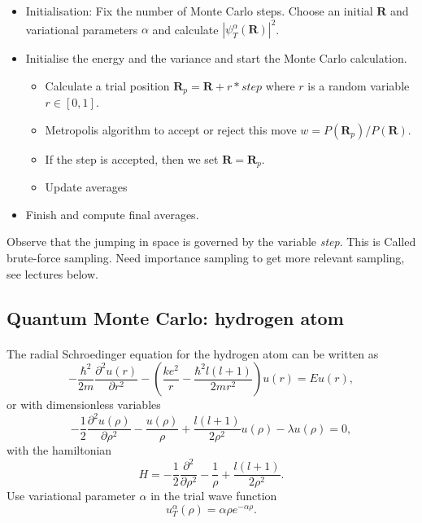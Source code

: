 \documentclass[%
twoside,                 %
final,                   %
10pt]{article}
\begin{document}
\begin{itemize}
   \item Initialisation: Fix the number of Monte Carlo steps. Choose an initial $\bm{R}$ and variational parameters $\alpha$ and calculate $\left|\psi_T^{\alpha}(\bm{R})\right|^2$. 

   \item Initialise the energy and the variance and start the Monte Carlo calculation.
\begin{itemize}

      \item Calculate  a trial position  $\bm{R}_p=\bm{R}+r*step$ where $r$ is a random variable $r \in [0,1]$.

      \item Metropolis algorithm to accept or reject this move  $w = P(\bm{R}_p)/P(\bm{R})$.

      \item If the step is accepted, then we set $\bm{R}=\bm{R}_p$. 

      \item Update averages

\end{itemize}

\noindent
   \item Finish and compute final averages.
\end{itemize}

\noindent
Observe that the jumping in space is governed by the variable \emph{step}. This is Called brute-force sampling.
Need importance sampling to get more relevant sampling, see lectures below.



\subsection{Quantum Monte Carlo: hydrogen atom}

\paragraph{}
The radial Schroedinger equation for the hydrogen atom can be
written as
\[
-\frac{\hbar^2}{2m}\frac{\partial^2 u(r)}{\partial r^2}-
\left(\frac{ke^2}{r}-\frac{\hbar^2l(l+1)}{2mr^2}\right)u(r)=Eu(r),
\]
or with dimensionless variables
\[
-\frac{1}{2}\frac{\partial^2 u(\rho)}{\partial \rho^2}-
\frac{u(\rho)}{\rho}+\frac{l(l+1)}{2\rho^2}u(\rho)-\lambda u(\rho)=0,
\label{eq:hydrodimless1}
\]
with the hamiltonian
\[
H=-\frac{1}{2}\frac{\partial^2 }{\partial \rho^2}-
\frac{1}{\rho}+\frac{l(l+1)}{2\rho^2}.
\]
Use variational parameter $\alpha$ in the trial
wave function 
\[
   u_T^{\alpha}(\rho)=\alpha\rho e^{-\alpha\rho}. 
   \label{eq:trialhydrogen}
\]
\end{document}
